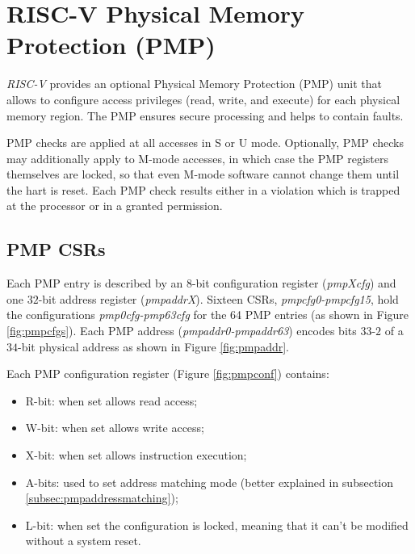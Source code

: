 \section{RISC-V Physical Memory Protection (PMP)}
\label{sec:riscv_pmp}

\textit{RISC-V} provides an optional Physical Memory Protection (PMP) unit that allows
to configure access privileges (read, write, and execute) for each physical memory
region. The PMP ensures secure processing and helps to contain faults.

PMP checks are applied at all accesses in S or U mode. Optionally, PMP checks
may additionally apply to M-mode accesses, in which case the PMP registers themselves
are locked, so that even M-mode software cannot change them until the hart is
reset. Each PMP check results either in a violation which is trapped at the processor
or in a granted permission.

\subsection{PMP CSRs}
\label{subsec:riscv_pmpcsr}

Each PMP entry is described by an 8-bit configuration register (\textit{pmpXcfg})
and one $32$-bit address register (\textit{pmpaddrX}). Sixteen CSRs, \textit{pmpcfg0-pmpcfg15},
hold the configurations \textit{pmp0cfg-pmp63cfg} for the 64 PMP entries (as
shown in Figure \ref{fig:pmpcfgs}). Each PMP address (\textit{pmpaddr0-pmpaddr63})
encodes bits $33$-$2$ of a $34$-bit physical address as shown in Figure \ref{fig:pmpaddr}.

Each PMP configuration register (Figure \ref{fig:pmpconf}) contains:
\begin{itemize}[noitemsep]
  \item R-bit: when set allows read access;

  \item W-bit: when set allows write access;

  \item X-bit: when set allows instruction execution;

  \item A-bits: used to set address matching mode (better explained in subsection
    \ref{subsec:pmpaddressmatching});

  \item L-bit: when set the configuration is locked, meaning that it can't be modified
    without a system reset.
\end{itemize}

